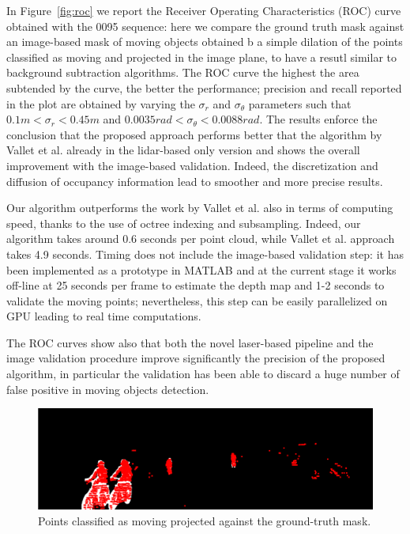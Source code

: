 In Figure~\ref{fig:roc} we report the Receiver Operating Characteristics (ROC) curve obtained with the 0095 sequence: here we compare the ground truth mask against an image-based mask of moving objects obtained b a simple dilation of the points classified as moving and projected in the image plane, to have a resutl similar to background subtraction algorithms. 
The ROC curve the highest the area subtended by the curve, the better the performance; precision and recall reported in the plot are obtained by varying the $\sigma_r$ and $\sigma_{\theta}$ parameters such that $0.1m<\sigma_r<0.45m$ and $0.0035rad<\sigma_{\theta}<0.0088rad$.
The results enforce the conclusion that the proposed approach performs better that the algorithm by Vallet et al. already in the lidar-based only version and shows the overall improvement with the image-based validation. Indeed, the discretization and diffusion of occupancy information lead to smoother and more precise results.

Our algorithm outperforms the work by Vallet et al. also in terms of computing speed, thanks to the use of octree indexing and subsampling. 
Indeed, our algorithm takes around 0.6 seconds per point cloud, while Vallet et al. approach takes 4.9 seconds.
Timing does not include the image-based validation step: it has been implemented as a prototype in MATLAB and at the current stage it works off-line at 25 seconds per frame to estimate the depth map and 1-2 seconds to validate the moving points; nevertheless, this step can be easily parallelized on GPU leading to real time computations.

The ROC curves show also that both the novel laser-based pipeline and the image validation procedure improve significantly the precision of the proposed algorithm, in particular the validation has been able to discard a huge number of false positive in moving objects detection.


\begin{figure}[t]
\centering
\includegraphics[width=0.8\columnwidth]{./img/ch-laser/points_result_on_mask}
\caption{Points classified as moving projected against the ground-truth mask.} 
\label{fig:points}
\end{figure}




